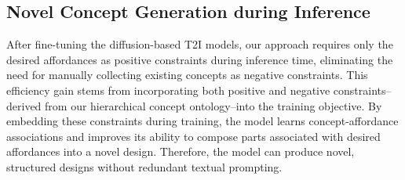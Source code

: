\subsection{Novel Concept Generation during Inference}
\label{sec:inference}
After fine-tuning the diffusion-based T2I models, our approach requires only the desired affordances as positive constraints during inference time, eliminating the need for manually collecting existing concepts as negative constraints. This efficiency gain stems from incorporating both positive and negative constraints--derived from our hierarchical concept ontology--into the training objective. By embedding these constraints during training, the model learns concept-affordance associations and improves its ability to compose parts associated with desired affordances into a novel design. Therefore, the model can produce novel, structured designs without redundant textual prompting.




